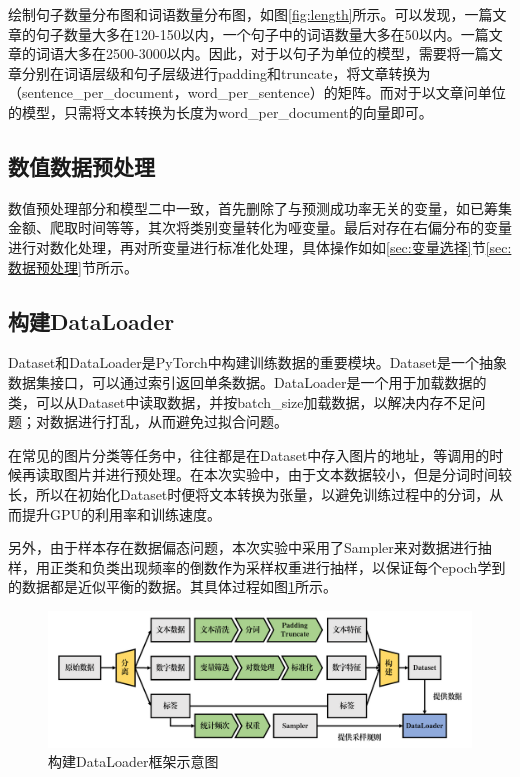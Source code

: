 \documentclass[lang=cn,a4paper]{elegantpaper}
\begin{document}
绘制句子数量分布图和词语数量分布图，如图\ref{fig:length}所示。可以发现，一篇文章的句子数量大多在120-150以内，一个句子中的词语数量大多在50以内。一篇文章的词语大多在2500-3000以内。因此，对于以句子为单位的模型，需要将一篇文章分别在词语层级和句子层级进行padding和truncate，将文章转换为（sentence\_per\_document，word\_per\_sentence）的矩阵。而对于以文章问单位的模型，只需将文本转换为长度为word\_per\_document的向量即可。

\subsection{数值数据预处理}
数值预处理部分和模型二中一致，首先删除了与预测成功率无关的变量，如已筹集金额、爬取时间等等，其次将类别变量转化为哑变量。最后对存在右偏分布的变量进行对数化处理，再对所变量进行标准化处理，具体操作如如\ref{sec:变量选择}节\ref{sec:数据预处理}节所示。

\subsection{构建DataLoader}
Dataset和DataLoader是PyTorch中构建训练数据的重要模块。Dataset是一个抽象数据集接口，可以通过索引返回单条数据。DataLoader是一个用于加载数据的类，可以从Dataset中读取数据，并按batch\_size加载数据，以解决内存不足问题；对数据进行打乱，从而避免过拟合问题。

在常见的图片分类等任务中，往往都是在Dataset中存入图片的地址，等调用的时候再读取图片并进行预处理。在本次实验中，由于文本数据较小，但是分词时间较长，所以在初始化Dataset时便将文本转换为张量，以避免训练过程中的分词，从而提升GPU的利用率和训练速度。

另外，由于样本存在数据偏态问题，本次实验中采用了Sampler来对数据进行抽样，用正类和负类出现频率的倒数作为采样权重进行抽样，以保证每个epoch学到的数据都是近似平衡的数据。其具体过程如图\ref{fig:dataloader}所示。

\begin{figure}[!htbp]
  \centering
  \includegraphics[width=\linewidth]{image/build dataloader.pdf}
  \caption{构建DataLoader框架示意图}
  \label{fig:dataloader}
\end{figure}
\end{document}
